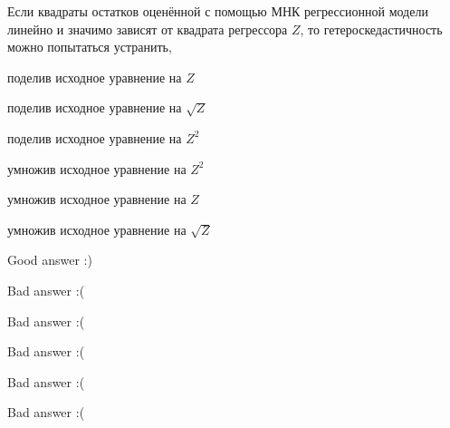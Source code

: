 
\begin{question}
Если квадраты остатков оценённой с помощью МНК регрессионной модели линейно и значимо зависят от квадрата регрессора \(Z\), то гетероскедастичность можно попытаться устранить,
\begin{answerlist}
  \item поделив исходное уравнение на \(Z\)
  \item поделив исходное уравнение на \(\sqrt Z\)
  \item поделив исходное уравнение на \({Z^2}\)
  \item умножив исходное уравнение на \({Z^2}\)
  \item умножив исходное уравнение на \(Z\)
  \item умножив исходное уравнение на \(\sqrt Z\)
\end{answerlist}
\end{question}

\begin{solution}
\begin{answerlist}
  \item Good answer :)
  \item Bad answer :(
  \item Bad answer :(
  \item Bad answer :(
  \item Bad answer :(
  \item Bad answer :(
\end{answerlist}
\end{solution}

